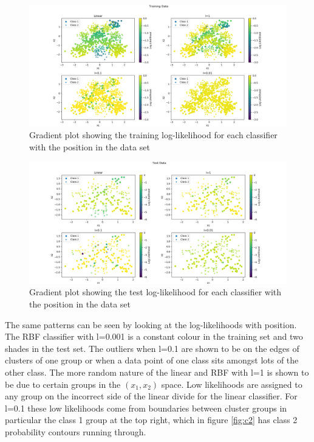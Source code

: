 \documentclass[twoside,twocolumn]{article}
\begin{document}
\begin{figure}[h]
  \centering
    \includegraphics[width=\linewidth]{trainingdatallmap}
  \caption{Gradient plot showing the training log-likelihood for each classifier with the position in the data set}
  \label{fig:lltrainmap}
\end{figure}
\begin{figure}[h]
  \centering
    \includegraphics[width=\linewidth]{testdatallmap}
  \caption{Gradient plot showing the test log-likelihood for each classifier with the position in the data set}
  \label{fig:lltestmap}
\end{figure}

The same patterns can be seen by looking at the log-likelihoods with position. The RBF classifier with l=0.001 is a constant colour in the training set and two shades in the test set. The outliers when l=0.1 are shown to be on the edges of clusters of one group or when a data point of one class sits amongst lots of the other class. The more random nature of the linear and RBF with l=1 is shown to be due to certain groups in the $(x_1,x_2)$ space. Low likelihoods are assigned to any group on the incorrect side of the linear divide for the linear classifier. For l=0.1 these low likelihoods come from boundaries between cluster groups in particular the class 1 group at the top right, which in figure \ref{fig:c2} has class 2 probability contours running through.
\twocolumn
\end{document}
